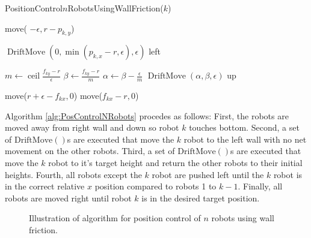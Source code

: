 \begin{algorithm}
\caption{PositionControl$n$RobotsUsingWallFriction($k$)}\label{alg:PosControlNRobots}
\begin{algorithmic}[1]
\State move( $-\epsilon, r-p_{k,y}$) %


\State $\operatorname{DriftMove}(0, \min(p_{k,x} - r,\epsilon), \epsilon)$ left   %
\EndWhile

\State $m \gets \operatorname{ceil}\frac{f_{ky}-r}{\epsilon}$
\State $\beta \gets \frac{f_{ky}-r}{m}$
\State $\alpha \gets \beta - \frac{\epsilon}{m}$
\State $\operatorname{DriftMove}(\alpha, \beta, \epsilon)$ up   %
\EndFor

\State move($r+\epsilon-f_{kx}, 0$)  %
\State move($f_{kx}-r, 0$)  

\end{algorithmic}
\end{algorithm}
Algorithm \ref{alg:PosControlNRobots} procedes as follows:  
First, the robots are moved  away from right wall and down so robot $k$ touches bottom.
Second, a set of $\operatorname{DriftMove()}$s are executed that  move the $k$ robot to the left wall with no net movement on the other robots.
Third, a set of $\operatorname{DriftMove()}$s are executed that  move the $k$ robot to it's target height and return the other robots to their initial heights. 
Fourth, all robots except the $k$ robot are pushed left until the $k$ robot is in the correct relative $x$ position compared to robots 1 to $k-1$.
Finally, all robots are moved right until robot $k$ is in the desired target position.
\begin{figure}
\begin{center}
\end{center}
\caption{\label{fig:construction2d}
Illustration of algorithm for position control of $n$ robots using wall friction.
}
\end{figure}














